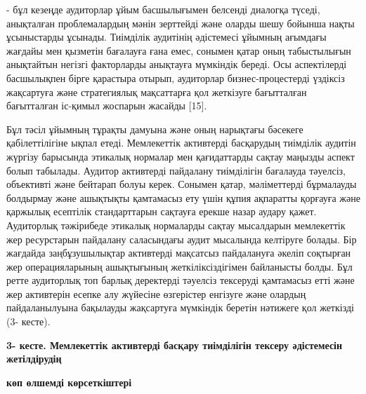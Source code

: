 - бұл кезеңде аудиторлар ұйым басшылығымен белсенді диалогқа түседі,
анықталған проблемалардың мәнін зерттейді және оларды шешу бойынша нақты
ұсыныстарды ұсынады. Тиімділік аудитінің әдістемесі ұйымның ағымдағы
жағдайы мен қызметін бағалауға ғана емес, сонымен қатар оның
табыстылығын анықтайтын негізгі факторларды анықтауға мүмкіндік береді.
Осы аспектілерді басшылықпен бірге қарастыра отырып, аудиторлар
бизнес-процестерді үздіксіз жақсартуға және стратегиялық мақсаттарға қол
жеткізуге бағытталған бағытталған іс-қимыл жоспарын жасайды {[}15{]}.

Бұл тәсіл ұйымның тұрақты дамуына және оның нарықтағы бәсекеге
қабілеттілігіне ықпал етеді. Мемлекеттік активтерді басқарудың тиімділік
аудитін жүргізу барысында этикалық нормалар мен қағидаттарды сақтау
маңызды аспект болып табылады. Аудитор активтерді пайдалану тиімділігін
бағалауда тәуелсіз, объективті және бейтарап болуы керек. Сонымен қатар,
мәліметтерді бұрмалауды болдырмау және ашықтықты қамтамасыз ету үшін
құпия ақпаратты қорғауға және қаржылық есептілік стандарттарын сақтауға
ерекше назар аудару қажет. Аудиторлық тәжірибеде этикалық нормаларды
сақтау мысалдарын мемлекеттік жер ресурстарын пайдалану саласындағы
аудит мысалында келтіруге болады. Бір жағдайда заңбұзушылықтар
активтерді мақсатсыз пайдалануға әкеліп соқтырған жер операцияларының
ашықтығының жеткіліксіздігімен байланысты болды. Бұл ретте аудиторлық
топ барлық деректерді тәуелсіз тексеруді қамтамасыз етті және жер
активтерін есепке алу жүйесіне өзгерістер енгізуге және олардың
пайдаланылуына бақылауды жақсартуға мүмкіндік беретін нәтижеге қол
жеткізді (3- кесте).

{\bfseries 3- кесте. Мемлекеттік активтерді басқару тиімділігін тексеру
әдістемесін жетілдірудің}

{\bfseries көп өлшемді көрсеткіштері}

